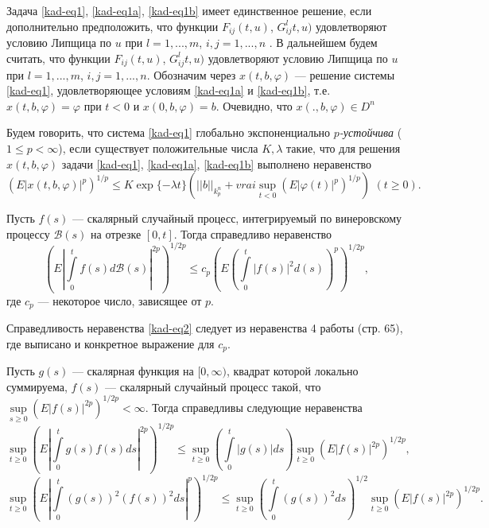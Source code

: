 Задача \eqref{kad-eq1}, \eqref{kad-eq1a}, \eqref{kad-eq1b} имеет единственное решение, если
дополнительно предположить, что функции $F_{ij}(t,u)$,
$G^l_{ij}t,u)$ удовлетворяют условию Липщица по $u$ при $l =
1,...,m$, $i,j = 1,...,n$ \cite{kad10}. В дальнейшем будем считать, что
функции $F_{ij}(t,u)$, $G^l_{ij}t,u)$ удовлетворяют условию Липщица
по $u$ при $l = 1,...,m$, $i,j = 1,...,n$.  Обозначим через $x(t, b,
\varphi)$ --- решение системы \eqref{kad-eq1}, удовлетворяющее условиям \eqref{kad-eq1a} и
\eqref{kad-eq1b}, т.е. $x(t, b, \varphi ) = \varphi$ при $t < 0$ и $x(0, b,
\varphi ) = b$. Очевидно, что $x(., b, \varphi ) \in D^n$
\begin{definition}\label{kad-def2}
Будем говорить, что система \eqref{kad-eq1} глобально
экспоненциально \textit{ $p$-устой\-чи\-ва} ($1 \leq p < \infty$), если
существует положительные числа $K,\lambda$ такие, что для решения
$x(t, b, \varphi)$ задачи \eqref{kad-eq1}, \eqref{kad-eq1a}, \eqref{kad-eq1b} выполнено неравенство
$$
(E|x(t, b, \varphi)|^p)^{1/p} \leq K\exp \{-\lambda t\}\left
(||b||_{k_p^n} + vrai \sup \limits _{t < 0}(E|\varphi
(t)|^p)^{1/p}\right ){\,} {\,} (t \geq 0).
$$
\end{definition}

\begin{lemma}\label{kad-lem2}
Пусть $f(s)$ --- скалярный случайный процесс,
интегрируемый по винеровскому процессу $\mathcal B(s)$ на отрезке
$[0, t]$. Тогда справедливо неравенство
\begin{equation}\label{kad-eq2}
  \left (E\left |\int \limits _0^tf(s)d\mathcal B(s)\right
|^{2p}\right )^{1/2p} \leq c_p \left (E\left (\int \limits
_0^t|f(s)|^2d(s)\right )^p\right )^{1/2p}, %
\end{equation}
где $c_p$ --- некоторое число, зависящее от $p$.
\end{lemma}

Справедливость неравенства \eqref{kad-eq2} следует из неравенства 4 работы \cite{kad8}
(стр. 65), где выписано и конкретное выражение для $c_p$.

\begin{lemma}\label{kad-lem3}
Пусть $g(s)$ --- скалярная функция на $[0, \infty)$,
квадрат которой локально суммируема, $f(s)$ --- скалярный случайный
процесс такой, что $\sup \limits _{s \geq 0}(E|f(s)|^{2p})^{1/2p} <
\infty$. Тогда справедливы следующие неравенства
\begin{equation}\label{kad-eq3}
\sup \limits _{t \geq 0}\left(E\left|\int \limits
_0^tg(s)f(s)ds\right|^{2p}\right)^{1/2p} \leq \sup \limits _{t \geq
0}\left (\int \limits _0^t|g(s)|ds\right )\sup \limits _{t \geq
0}(E|f(s)|^{2p})^{1/2p}, %
\end{equation}
\begin{equation}\label{kad-eq4}
\sup \limits _{t \geq 0}\left(E\left|\int \limits
_0^t(g(s))^2(f(s))^2ds\right|^{p}\right)^{1/2p} \leq \sup \limits
_{t \geq 0}\left (\int \limits _0^t(g(s))^2ds\right)^{1/2}\sup
\limits _{t \geq 0}(E|f(s)|^{2p})^{1/2p}. %
\end{equation}


\end{lemma}

